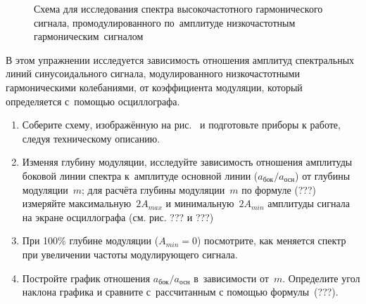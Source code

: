 

\begin{figure}[h!]
	\centering
	\caption{Схема для исследования спектра высокочастотного гармонического сигнала, промодулированного по~амплитуде низкочастотным гармоническим~сигналом}
\end{figure}

\begin{lab:task}
	В этом упражнении исследуется зависимость отношения амплитуд спектральных линий синусоидального сигнала, модулированного низкочастотными гармоническими колебаниями, от коэффициента модуляции, который определяется с~помощью осциллографа.
	\begin{enumerate}
		\item Соберите схему, изображённую на рис.~ и подготовьте приборы к работе, следуя техническому описанию.
		\item Изменяя глубину модуляции, исследуйте зависимость отношения амплитуды боковой линии спектра к~амплитуде основной линии ($a_\text{бок}/a_\text{осн}$) от глубины модуляции~$m$; для расчёта глубины модуляции~$m$ по формуле (???)
		измеряйте максимальную~$2A_{max}$ и минимальную~$2A_{min}$ амплитуды сигнала на экране осциллографа (см. рис. ??? и ???)
		\item При 100\% глубине модуляции ($A_{min}=0$) посмотрите, как меняется спектр при увеличении частоты модулирующего сигнала.
		\item Постройте график отношения $a_\text{бок}/a_\text{осн}$ в~зависимости от~$m$. Определите угол наклона графика и сравните с~рассчитанным с помощью формулы~(???).
	\end{enumerate}
\end{lab:task}


